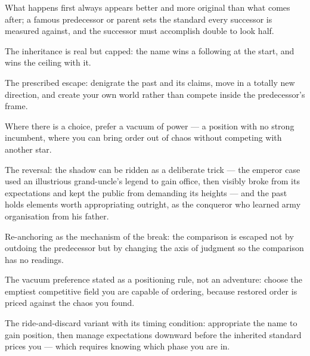 

\begin{distilled}
  \item What happens first always appears better and more original than what comes after; a famous predecessor or parent sets the standard every successor is measured against, and the successor must accomplish double to look half.
  \item The inheritance is real but capped: the name wins a following at the start, and wins the ceiling with it.
  \item The prescribed escape: denigrate the past and its claims, move in a totally new direction, and create your own world rather than compete inside the predecessor's frame.
  \item Where there is a choice, prefer a vacuum of power --- a position with no strong incumbent, where you can bring order out of chaos without competing with another star.
  \item The reversal: the shadow can be ridden as a deliberate trick --- the emperor case used an illustrious grand-uncle's legend to gain office, then visibly broke from its expectations and kept the public from demanding its heights --- and the past holds elements worth appropriating outright, as the conqueror who learned army organisation from his father.
\end{distilled}

\begin{unique}
  \item Re-anchoring as the mechanism of the break: the comparison is escaped not by outdoing the predecessor but by changing the axis of judgment so the comparison has no readings.
  \item The vacuum preference stated as a positioning rule, not an adventure: choose the emptiest competitive field you are capable of ordering, because restored order is priced against the chaos you found.
  \item The ride-and-discard variant with its timing condition: appropriate the name to gain position, then manage expectations downward before the inherited standard prices you --- which requires knowing which phase you are in.
\end{unique}
